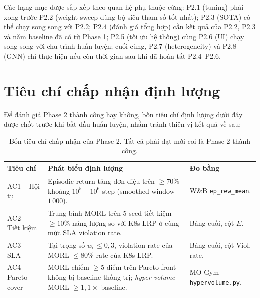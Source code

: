 Các hạng mục được sắp xếp theo quan hệ phụ thuộc cứng: P2.1 (tuning)
phải xong trước P2.2 (weight sweep dùng bộ siêu tham số tốt nhất);
P2.3 (SOTA) có thể chạy song song với P2.2; P2.4 (đánh giá tổng hợp)
cần kết quả của P2.2, P2.3 và năm baseline đã có từ Phase 1; P2.5
(tối ưu hệ thống) cùng P2.6 (UI) chạy song song với chu trình huấn
luyện; cuối cùng, P2.7 (heterogeneity) và P2.8 (GNN) chỉ thực hiện
nếu còn thời gian sau khi đã hoàn tất P2.4--P2.6.


\section{Tiêu chí chấp nhận định lượng}
\label{sec:p2-criteria}

Để đánh giá Phase 2 thành công hay không, bốn tiêu chí định lượng
dưới đây được chốt trước khi bắt đầu huấn luyện, nhằm tránh thiên
vị kết quả về sau:

\begin{table}[H]
  \centering
  \caption{Bốn tiêu chí chấp nhận của Phase 2. Tất cả phải đạt
  \texttt{\checkmark} mới coi là Phase 2 thành công.}
  \label{tab:p2-criteria}
  \footnotesize
  \begin{tabularx}{\linewidth}{l X l}
    \toprule
    \textbf{Tiêu chí} & \textbf{Phát biểu định lượng} & \textbf{Đo bằng} \\
    \midrule
    AC1 -- Hội tụ      & Episodic return tăng đơn điệu trên $\ge 70\%$
                          khoảng $10^5$ -- $10^6$ step (smoothed window
                          $1\,000$).
                       & W\&B \texttt{ep\_rew\_mean}. \\
    AC2 -- Tiết kiệm   & Trung bình MORL trên $5$ seed tiết kiệm
                          $\ge 10\%$ năng lượng so với K8s LRP ở cùng
                          mức SLA violation rate.
                       & Bảng cuối, cột $E$. \\
    AC3 -- SLA          & Tại trọng số $w_{\mathrm{e}} \le 0{,}3$,
                          violation rate của MORL $\le 80\%$ rate của
                          K8s LRP.
                       & Bảng cuối, cột Viol.\,rate. \\
    AC4 -- Pareto cover & MORL chiếm $\ge 5$ điểm trên Pareto front
                          không bị baseline thống trị; \emph{hyper-volume}
                          MORL $\ge 1{,}1\times$ baseline.
                       & MO-Gym \texttt{hypervolume.py}. \\
    \bottomrule
  \end{tabularx}
\end{table}


